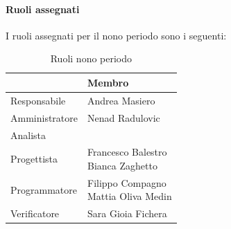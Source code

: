 \documentclass[a4paper,12pt]{article}
\begin{document}
            \paragraph{Ruoli assegnati}
            I ruoli assegnati per il nono periodo sono i seguenti:
                \begin{table}[H]
                \centering
                \caption{Ruoli nono periodo}
                \begin{tabular}{|l|l|}
                \hline
                    \rowcolor{lightgray}{\textbf{Ruolo}} & {\textbf{Membro}} \\
                \hline
                    Responsabile & Andrea Masiero  \\
                \hline
                    Amministratore & Nenad Radulovic  \\
                \hline
                    Analista &  \\
                \hline
                    Progettista & \makecell[l]{ Francesco Balestro \\ Bianca Zaghetto}  \\
                \hline
                    Programmatore & \makecell[l]{ Filippo Compagno \\ Mattia Oliva Medin} \\
                \hline
                    Verificatore & Sara Gioia Fichera \\
                \hline
                \end{tabular}
                \end{table}
                
\end{document}
